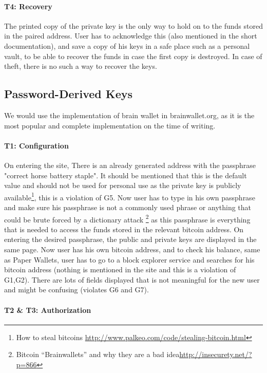 \paragraph{T4: Recovery}

The printed copy of the private key is the only way to hold on to the funds stored in the paired address. User has to acknowledge this (also mentioned in the short documentation), and save a copy of his keys in a safe place such as a personal vault, to be able to recover the funds in case the first copy is destroyed. In case of theft, there is no such a way to recover the keys.


\subsection{Password-Derived Keys} We would use the implementation of brain wallet in brainwallet.org, as it is the most popular and complete implementation on the time of writing.

\paragraph{T1: Configuration} 

On entering the site, There is an already generated address with the passphrase "correct horse battery staple". It should be mentioned that this is the default value and should not be used for personal use as the private key is publicly available\footnote{How to steal bitcoins \url{http://www.palkeo.com/code/stealing-bitcoin.html}}, this is a violation of G5. Now user has to type in his own passphrase and make sure his passphrase is not a commonly used phrase or anything that could be brute forced by a dictionary attack \footnote{Bitcoin “Brainwallets” and why they are a bad idea\url{http://insecurety.net/?p=866}} as this passphrase is everything that is needed to access the funds stored in the relevant bitcoin address. On entering the desired passphrase, the public and private keys are displayed in the same page. Now user has his own bitcoin address, and to check his balance, same as Paper Wallets, user has to go to a block explorer service and searches for his bitcoin address (nothing is mentioned in the site and this is a violation of G1,G2). There are lots of fields displayed that is not meaningful for the new user and might be confusing (violates G6 and G7).

\paragraph{T2 \& T3: Authorization}


